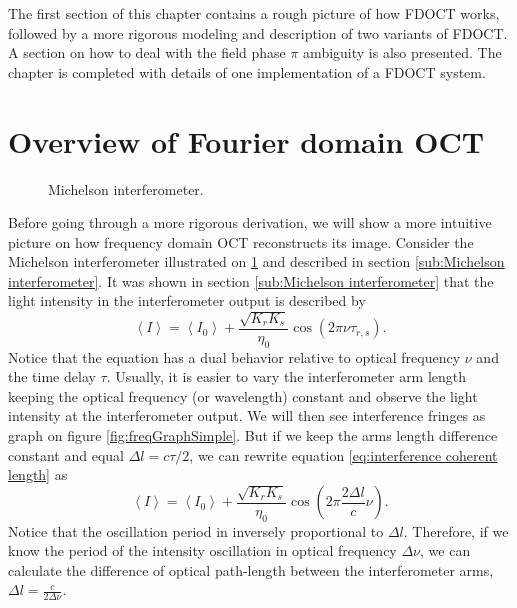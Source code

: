 \documentclass[12pt,twoside,english]{book}
\renewcommand{\~}{\perispomeni}%
\numberwithin{equation}{section}
\numberwithin{figure}{section}
\begin{document}
The first section of this chapter contains a rough picture of how \gls{FDOCT} works, followed by a more rigorous modeling and description of two variants of \gls{FDOCT}. A section on how to deal with the field phase $\pi$ ambiguity is also presented. The chapter is completed with details of one implementation of a \gls{FDOCT} system.

\section{Overview of Fourier domain OCT}

%
\begin{figure}[h]
	\centering
	\caption{Michelson interferometer.}
	\label{fig:Michelson-interferometer-2}
\end{figure}


Before going through a more rigorous derivation, we will show a more intuitive picture on how frequency domain OCT reconstructs its image. Consider the Michelson interferometer illustrated on \ref{fig:Michelson-interferometer-2} and described in section \ref{sub:Michelson interferometer}. It was shown in section \ref{sub:Michelson interferometer} that the light intensity in the interferometer output is described by
\begin{equation} \left\langle I\right\rangle =\left\langle I_{0}\right\rangle +\frac{\sqrt{K_{r}K_{s}}}{\eta_{0}}\cos\left(2\pi\nu\tau_{r,s}\right).\end{equation}
Notice that the equation has a dual behavior relative to optical frequency $\nu$ and the time delay $\tau$. Usually, it is easier to vary the interferometer arm length keeping the optical frequency (or wavelength) constant and observe the light intensity at the interferometer output. We will then see interference fringes as graph on figure \ref{fig:freqGraphSimple}. But if we keep the arms length difference constant and equal $\Delta l=c\tau/2$, we can rewrite equation \ref{eq:interference coherent length} as
\begin{equation}
\left\langle I\right\rangle =\left\langle I_{0}\right\rangle +\frac{\sqrt{K_{r}K_{s}}}{\eta_{0}}\cos\left(2\pi\frac{2\Delta l}{c}\nu\right).\end{equation}
Notice that the oscillation period in inversely proportional to $\Delta l$. Therefore, if we know the period of the intensity oscillation in optical frequency $\Delta\nu$, we can calculate the difference of optical path-length between the interferometer arms, $\Delta l=\frac{c}{2\Delta\nu}$.
\end{document}
